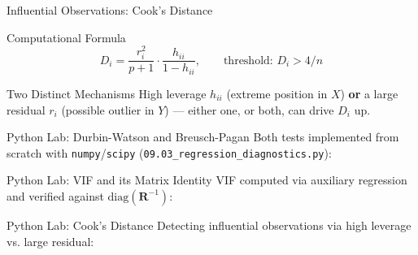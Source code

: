 \documentclass[10pt, aspectratio=169]{beamer}
\begin{document}
\begin{frame}{Influential Observations: Cook's Distance}
  \footnotesize
  \begin{block}{Computational Formula}
    $$D_i=\frac{r_i^2}{p+1}\cdot\frac{h_{ii}}{1-h_{ii}}, \qquad \text{threshold: } D_i>4/n$$
  \end{block}
  \pause

  \vspace{0.1cm}
  \begin{alertblock}{Two Distinct Mechanisms}
    High leverage $h_{ii}$ (extreme position in $X$) \textbf{or} a large residual $r_i$ (possible outlier in $Y$) --- either one, or both, can drive $D_i$ up.
  \end{alertblock}
\end{frame}

\begin{frame}[fragile]{Python Lab: Durbin-Watson and Breusch-Pagan}
  \scriptsize
  Both tests implemented from scratch with \texttt{numpy}/\texttt{scipy} (\texttt{09.03\_regression\_diagnostics.py}):
  {
  }
\end{frame}

\begin{frame}[fragile]{Python Lab: VIF and its Matrix Identity}
  \scriptsize
  VIF computed via auxiliary regression and verified against $\text{diag}(\mathbf{R}^{-1})$:
  {
  }
\end{frame}

\begin{frame}[fragile]{Python Lab: Cook's Distance}
  \scriptsize
  Detecting influential observations via high leverage vs. large residual:
  {
  }
\end{frame}
\end{document}
